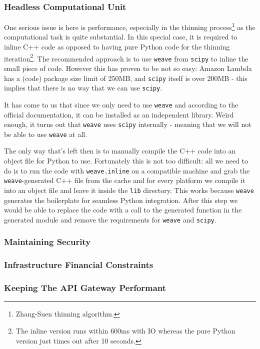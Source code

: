 
\subsubsection{Headless Computational Unit}

One serious issue is here is performance, especially in the thinning process\footnote{Zhang-Suen thinning algorithm.} as the computational task is quite substantial. In this special case, it is required to inline C++ code as opposed to having pure Python code for the thinning iteration\footnote{The inline version runs within 600ms with IO whereas the pure Python version just times out after 10 seconds.}. The recommended approach is to use \texttt{weave} from \texttt{scipy} to inline the small piece of code. However this has proven to be not so easy: Amazon Lambda has a (code) package size limit of 250MB, and \texttt{scipy} itself is over 200MB - this implies that there is no way that we can use \texttt{scipy}.

It has come to us that since we only need to use \texttt{weave} and according to the official documentation, it can be installed as an independent library. Weird enough, it turns out that \texttt{weave} uses \texttt{scipy} internally - meaning that we will not be able to use \texttt{weave} at all.

The only way that's left then is to manually compile the C++ code into an object file for Python to use. Fortunately this is not too difficult: all we need to do is to run the code with \texttt{weave.inline} on a compatible machine and grab the \texttt{weave}-generated C++ file from the cache and for every platform we compile it into an object file and leave it inside the \texttt{lib} directory. This works because \texttt{weave} generates the boilerplate for seamless Python integration. After this step we would be able to replace the code with a call to the generated function in the generated module and remove the requirements for \texttt{weave} and \texttt{scipy}.

\subsubsection{Maintaining Security}


\subsubsection{Infrastructure Financial Constraints}


\subsubsection{Keeping The API Gateway Performant} 

